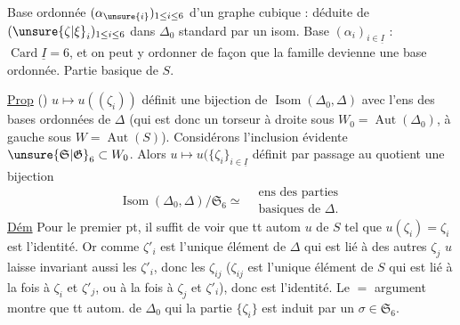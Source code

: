 Base ordonnée $(\alpha_{\unsure{i}})_{1\le i\le6}$ d'un graphe cubique : déduite de $(\unsure{\zeta|\xi}_i)_{1\le i\le6}$ dans $\Delta_0$ standard par  un isom. Base $(\alpha_i)_{i\in\underline I}$ : $\operatorname{Card}\underline I=6$, et on peut y ordonner  de façon que la famille devienne une base ordonnée. Partie basique de $S$.

\uline{Prop} () $u\mapsto u((\zeta_i))$ définit une  bijection de $\operatorname{Isom}(\Delta_0,\Delta)$ avec l'ens des bases ordonnées de $\Delta$ (qui est donc un torseur à droite sous $W_0=\operatorname{Aut}(\Delta_0)$, à gauche sous $W=\operatorname{Aut}(S)$). Considérons l'inclusion évidente $\unsure{\mathfrak S|\mathfrak G}_6\subset W_0$. Alors $u\mapsto u(\{\zeta_i\}_{i\in\underline I}$ définit par passage au quotient une bijection
\[
\operatorname{Isom}(\Delta_0,\Delta)/\mathfrak S_6\simeq
\begin{aligned}&\text{ens des parties}\\&\text{basiques de }\Delta.\end{aligned}
\]
\uline{Dém} Pour le premier pt, il suffit de voir que tt autom $u$ de $S$ tel que $u(\zeta_i)=\zeta_i$  est l'identité. Or comme $\zeta'_i$ est l'unique élément de $\Delta$  qui  est lié à   des autres $\zeta_j$  $u$ laisse invariant aussi les $\zeta'_i$, donc les $\zeta_{ij}$ ($\zeta_{ij}$ est l'unique élément de $S$ qui est lié à la fois à $\zeta_i$ et $\zeta'_j$, ou à la fois à $\zeta_j$ et $\zeta'_i$), donc est l'identité.  Le $=$ argument montre que tt autom. de $\Delta_0$ qui  la partie $\{\zeta_i\}$ est induit par un $\sigma\in\mathfrak S_6$.
